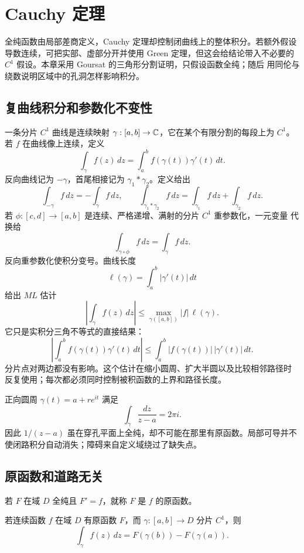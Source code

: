 \chapter{Cauchy 定理}
\label{chap:cauchy-theorem}

全纯函数由局部差商定义，Cauchy 定理却控制闭曲线上的整体积分。若额外假设
导数连续，可把实部、虚部分开并使用 Green 定理，但这会给结论带入不必要的
\(C^1\) 假设。本章采用 Goursat 的三角形分割证明，只假设函数全纯；随后
用同伦与绕数说明区域中的孔洞怎样影响积分。

\section{复曲线积分和参数化不变性}

一条分片 \(C^1\) 曲线是连续映射
\(\gamma:[a,b]\to\mathbb{C}\)，它在某个有限分割的每段上为 \(C^1\)。若 \(f\)
在曲线像上连续，定义
\[
 \int_\gamma f(z)\,dz
 =\int_a^b f(\gamma(t))\gamma'(t)\,dt.
\]
反向曲线记为 \(-\gamma\)，首尾相接记为 \(\gamma_1*\gamma_2\)。定义给出
\[
 \int_{-\gamma}f\,dz=-\int_\gamma f\,dz,\qquad
 \int_{\gamma_1*\gamma_2}f\,dz
 =\int_{\gamma_1}f\,dz+\int_{\gamma_2}f\,dz.
\]
若 \(\phi:[c,d]\to[a,b]\) 是连续、严格递增、满射的分片 \(C^1\) 重参数化，一元变量
代换给
\[
 \int_{\gamma\circ\phi}f\,dz=\int_\gamma f\,dz.
\]
反向重参数化使积分变号。曲线长度
\[
 \ell(\gamma)=\int_a^b|\gamma'(t)|\,dt
\]
给出 \(ML\) 估计
\begin{equation}
 \left|\int_\gamma f(z)\,dz\right|
 \le\max_{\gamma([a,b])}|f|\,\ell(\gamma).
 \label{eq:complex-ml-estimate}
\end{equation}
它只是实积分三角不等式的直接结果：
\[
 \left|\int_a^b f(\gamma(t))\gamma'(t)\,dt\right|
 \le\int_a^b|f(\gamma(t))|\,|\gamma'(t)|\,dt.
\]
分片点对两边都没有影响。这个估计在缩小圆周、扩大半圆以及比较相邻路径时
反复使用；每次都必须同时控制被积函数的上界和路径长度。

正向圆周 \(\gamma(t)=a+re^{it}\) 满足
\[
 \int_\gamma\frac{dz}{z-a}=2\pi i.
\]
因此 \(1/(z-a)\) 虽在穿孔平面上全纯，却不可能在那里有原函数。局部可导并不
使闭路积分自动消失；障碍来自定义域绕过了缺失点。

\section{原函数和道路无关}

若 \(F\) 在域 \(D\) 全纯且 \(F'=f\)，就称 \(F\) 是 \(f\) 的原函数。

\begin{theorem}[曲线积分基本定理]
\label{thm:complex-line-integral-fundamental}
若连续函数 \(f\) 在域 \(D\) 有原函数 \(F\)，而
\(\gamma:[a,b]\to D\) 分片 \(C^1\)，则
\[
 \int_\gamma f(z)\,dz=F(\gamma(b))-F(\gamma(a)).
\]
\end{theorem}

